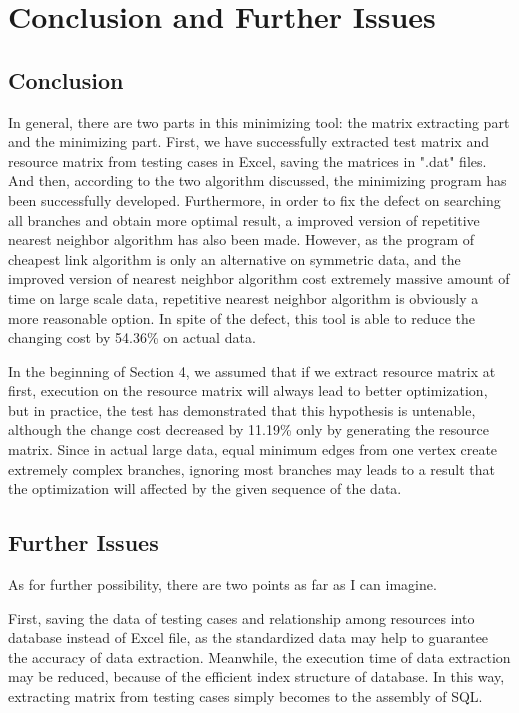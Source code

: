 \documentclass[12pt,a4paper]{article}
\begin{document}
\section{Conclusion and Further Issues}

\subsection{Conclusion}

In general, there are two parts in this minimizing tool: the matrix extracting part and the minimizing part. First, we have successfully extracted test matrix and resource matrix from testing cases in Excel, saving the matrices in ".dat" files. And then, according to the two algorithm discussed, the minimizing program has been successfully developed. Furthermore, in order to fix the defect on searching all branches and obtain more optimal result, a improved version of repetitive nearest neighbor algorithm has also been made. However, as the program of cheapest link algorithm is only an alternative on symmetric data, and the improved version of nearest neighbor algorithm cost extremely massive amount of time on large scale data, repetitive nearest neighbor algorithm is obviously a more reasonable option. In spite of the defect, this tool is able to reduce the changing cost by 54.36\% on actual data.

In the beginning of Section 4, we assumed that if we extract resource matrix at first, execution on the resource matrix will always lead to better optimization, but in practice, the test has demonstrated that this hypothesis is untenable, although the change cost decreased by 11.19\% only by generating the resource matrix. Since in actual large data, equal minimum edges from one vertex create extremely complex branches, ignoring most branches may leads to a result that the optimization will affected by the given sequence of the data.

\subsection{Further Issues}

As for further possibility, there are two points as far as I can imagine.

First, saving the data of testing cases and relationship among resources into database instead of Excel file, as the standardized data may help to guarantee the accuracy of data extraction. Meanwhile, the execution time of data extraction may be reduced, because of the efficient index structure of database. In this way, extracting matrix from testing cases simply becomes to the assembly of SQL.
\end{document}
